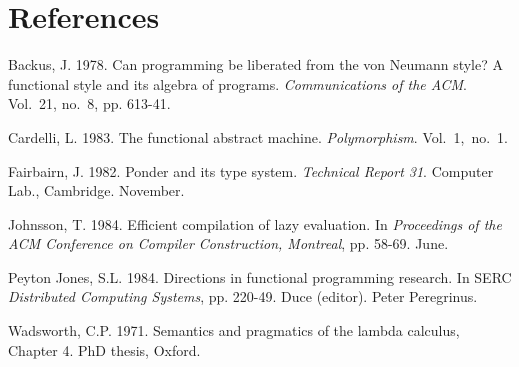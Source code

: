\vspace{-2\baselineskip}

%

\section*{References}

\begin{references}
\item Backus, J. 1978. Can programming be liberated from the von Neumann style? A
functional style and its algebra of programs. \textit{Communications of the ACM}. Vol.~21, no.~8, pp. 613-41.
\item Cardelli, L. 1983. The functional abstract machine. \textit{Polymorphism}. Vol.~1,~no.~1.
\item Fairbairn, J. 1982. Ponder and its type system. \textit{Technical Report 31}. Computer Lab.,
Cambridge. November.
\item Johnsson, T. 1984. Efficient compilation of lazy evaluation. In \textit{Proceedings of the ACM
Conference on Compiler Construction, Montreal}, pp. 58-69. June.
\item Peyton Jones, S.L. 1984. Directions in functional programming research. In SERC
\textit{Distributed Computing Systems}, pp. 220-49. Duce (editor). Peter Peregrinus.
\item Wadsworth, C.P. 1971. Semantics and pragmatics of the lambda calculus, Chapter 4.
PhD thesis, Oxford.

\end{references}
